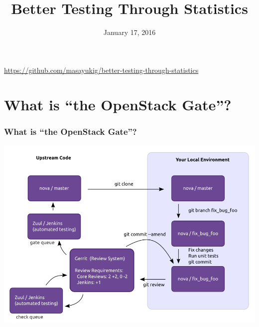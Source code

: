 \documentclass[aspectratio=43,11pt,hyperref={colorlinks=true}]{beamer}
\author[Matthew Treinish & Masayuki Igawa]{%
    \texorpdfstring{%
        \begin{columns}
            \column{.45\linewidth}
            \centering
            Matthew Treinish\\
            \href{mailto:mtreinish@kortar.org}{mtreinish@kortar.org}\\
        \texttt{mtreinish on Freenode}
        \column{.45\linewidth}
            \centering
            Masayuki Igawa\\
            \href{mailto:masayuki.igawa@gmail.com}{masayuki.igawa@gmail.com}\\
            \texttt{masayukig on Freenode}
        \end{columns}
        }
    {Matthew Treinish & Masayuki Igawa}
}
\date{January 17, 2016}
\title[Better Testing Through Statistics
\hspace{2em}\insertframenumber/\inserttotalframenumber]{Better Testing Through Statistics}
\begin{document}
{%
\begin{frame}[noframenumbering]
    \hypersetup{colorlinks,urlcolor=white}
    \titlepage{}
    \centering
    \href{https://github.com/masayukig/better-testing-through-statistics}{https://github.com/masayukig/better-testing-through-statistics}
\end{frame}
}

\section{What is ``the OpenStack Gate''?}
\begin{frame}
    \frametitle{What is ``the OpenStack Gate''?}
	\begin{center}
		\includegraphics[width=.85\textwidth]{code_review.png}
	\end{center}
\end{frame}
\end{document}
